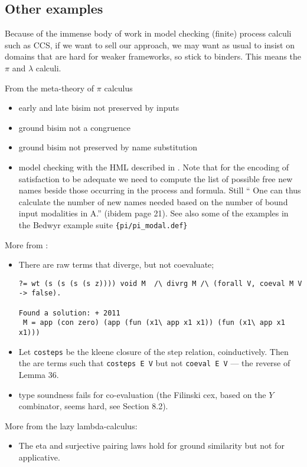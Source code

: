 \documentclass[sigconf]{acmart}
\begin{document}
\subsection{Other  examples}

Because of the immense body of work in model checking (finite) process
calculi such as CCS, if we want to sell our approach, we may want as
usual to insist on domains that are hard for weaker frameworks, so
stick to binders. This means the $\pi$ and $\lambda$ calculi.

From the meta-theory of $\pi$ calculus
\begin{itemize}
\item  early and late bisim not preserved by inputs
\item  ground bisim not a congruence
\item ground  bisim not preserved by name substitution
\item model checking with the HML described in \cite{Tiu:2010} . Note that for the
  encoding of satisfaction to be adequate we need to compute the list
  of possible free new names beside those occurring in the process and
  formula. Still `` One can thus calculate the number of new names
  needed based on the number of bound input modalities in A.'' (ibidem page 21). See also  some of the examples in the Bedwyr example suite \verb+{pi/pi_modal.def}+
\end{itemize}


 More from \cite{2007-Leroy-Grall}:
\begin{itemize}
  \item There are raw terms that diverge, but not coevaluate;
\begin{lstlisting}
?= wt (s (s (s (s z)))) void M  /\ divrg M /\ (forall V, coeval M V -> false).

Found a solution: + 2011
 M = app (con zero) (app (fun (x1\ app x1 x1)) (fun (x1\ app x1 x1)))
\end{lstlisting}
  \item Let \texttt{costeps} be the kleene closure of the step relation, coinductively. Then the are terms such that
    \texttt{costeps E V} but not \texttt{coeval E V} --- the reverse of Lemma 36.
  \item type soundness fails for co-evaluation (the Filinski cex, based on the $Y$ combinator, seems hard, see Section 8.2).
  \end{itemize}

  More from the lazy lambda-calculus:
  \begin{itemize}
  \item The eta  and surjective pairing laws hold for ground similarity but not for applicative.
  \end{itemize}
\end{document}
